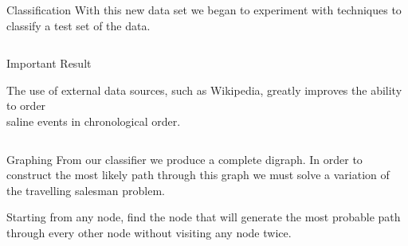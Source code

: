 \documentclass[final]{beamer}
\newlength{\onecolwid}
\newlength{\twocolwid}
\begin{document}
\begin{frame}[t]
\begin{columns}[t]
\begin{column}{\twocolwid}
\begin{columns}[t,totalwidth=\twocolwid]
\begin{column}{\onecolwid}
\begin{block}{Classification}
With this new data set we began to experiment with techniques to classify a test set of the data. 
\end{block}


\end{column} %

\end{columns} %


\begin{alertblock}{Important Result}
  \begin{center}
  The use of external data sources, such as Wikipedia, greatly improves the ability to order\\ saline events in chronological order.
  \end{center}
\end{alertblock} 


\begin{columns}[t,totalwidth=\twocolwid] %

\begin{column}{\onecolwid} %


\begin{block}{Graphing}
  From our classifier we produce a complete digraph.
  In order to construct the most likely path through this graph we must solve a variation of
  the travelling salesman problem.
  \vspace{1em}
  
  \begin{mdframed}
    Starting from any node, find the node that will
    generate the most probable path through  every
    other node without visiting any node twice.
\end{mdframed}


\end{block}
\end{column}
\end{columns}
\end{column}
\end{columns}
\end{frame}
\end{document}
